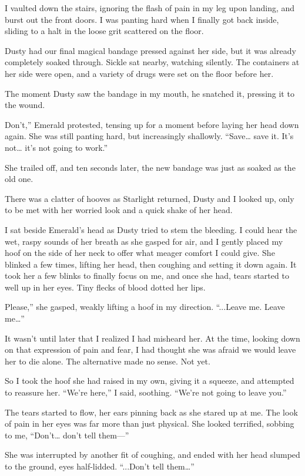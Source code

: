 I vaulted down the stairs, ignoring the flash of pain in my leg upon landing, and burst out the front doors. I was panting hard when I finally got back inside, sliding to a halt in the loose grit scattered on the floor.

Dusty had our final magical bandage pressed against her side, but it was already completely soaked through. Sickle sat nearby, watching silently. The containers at her side were open, and a variety of drugs were set on the floor before her.

The moment Dusty saw the bandage in my mouth, he snatched it, pressing it to the wound.

\leavevmode{}Don’t,” Emerald protested, tensing up for a moment before laying her head down again. She was still panting hard, but increasingly shallowly. “Save… save it. It’s not… it’s not going to work.”

She trailed off, and ten seconds later, the new bandage was just as soaked as the old one.

There was a clatter of hooves as Starlight returned, Dusty and I looked up, only to be met with her worried look and a quick shake of her head.

I sat beside Emerald’s head as Dusty tried to stem the bleeding. I could hear the wet, raspy sounds of her breath as she gasped for air, and I gently placed my hoof on the side of her neck to offer what meager comfort I could give. She blinked a few times, lifting her head, then coughing and setting it down again. It took her a few blinks to finally focus on me, and once she had, tears started to well up in her eyes. Tiny flecks of blood dotted her lips.

\leavevmode{}Please,” she gasped, weakly lifting a hoof in my direction. “...Leave me. Leave me…”

It wasn’t until later that I realized I had misheard her. At the time, looking down on that expression of pain and fear, I had thought she was afraid we would leave her to die alone. The alternative made no sense. Not yet.

So I took the hoof she had raised in my own, giving it a squeeze, and attempted to reassure her. “We’re here,” I said, soothing. “We’re not going to leave you.”

The tears started to flow, her ears pinning back as she stared up at me. The look of pain in her eyes was far more than just physical. She looked terrified, sobbing to me, “Don’t… don’t tell them—”

She was interrupted by another fit of coughing, and ended with her head slumped to the ground, eyes half-lidded. “...Don’t tell them…”

